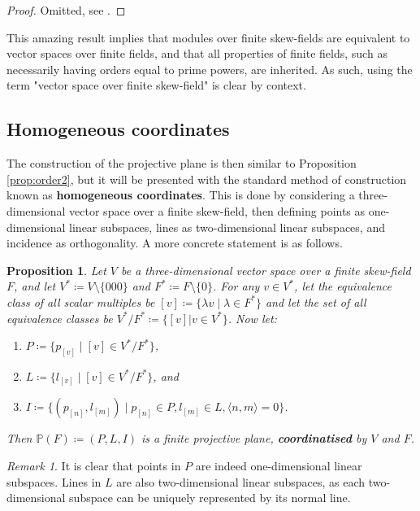 \documentclass{report}
\renewcommand{\P}{\mathbb{P}}
\newtheorem{proposition}[theorem]{Proposition}
\theoremstyle{definition}\newtheorem*{definition}{Definition}
\theoremstyle{definition}\newtheorem*{example}{Example}
\theoremstyle{remark}\newtheorem*{remark}{Remark}
\begin{document}
\begin{proof}
Omitted, see \cite{wedderburn}.
\end{proof}

This amazing result implies that modules over finite skew-fields are equivalent to vector spaces over finite fields, and that all properties of finite fields, such as necessarily having orders equal to prime powers, are inherited. As such, using the term "vector space over finite skew-field" is clear by context.

\subsection{Homogeneous coordinates}

The construction of the projective plane is then similar to Proposition \ref{prop:order2}, but it will be presented with the standard method of construction known as \textbf{homogeneous coordinates}. This is done by considering a three-dimensional vector space over a finite skew-field, then defining points as one-dimensional linear subspaces, lines as two-dimensional linear subspaces, and incidence as orthogonality. A more concrete statement is as follows.

\begin{proposition}
\label{prop:pfplane}
Let $ V $ be a three-dimensional vector space over a finite skew-field $ F $, and let $ V^* \coloneqq V \setminus \{ 000 \} $ and $ F^* \coloneqq F \setminus \{ 0 \} $. For any $ v \in V^* $, let the equivalence class of all scalar multiples be $ [v] \coloneqq \{ \lambda v \mid \lambda \in F^* \} $ and let the set of all equivalence classes be $ V^* / F^* \coloneqq \{ [v] | v \in V^* \} $. Now let:
\begin{enumerate}
  \item $ P \coloneqq \{ p_{[v]} \mid [v] \in V^* / F^* \} $,
  \item $ L \coloneqq \{ l_{[v]} \mid [v] \in V^* / F^* \} $, and
  \item $ I \coloneqq \{ (p_{[n]}, l_{[m]}) \mid p_{[n]} \in P, l_{[m]} \in L, \langle n, m \rangle = 0 \} $.
\end{enumerate}
Then $ \P(F) \coloneqq (P, L, I) $ is a finite projective plane, \textbf{coordinatised} by $ V $ and $ F $.
\end{proposition}

\begin{remark}
It is clear that points in $ P $ are indeed one-dimensional linear subspaces. Lines in $ L $ are also two-dimensional linear subspaces, as each two-dimensional subspace can be uniquely represented by its normal line.
\end{remark}
\end{document}
